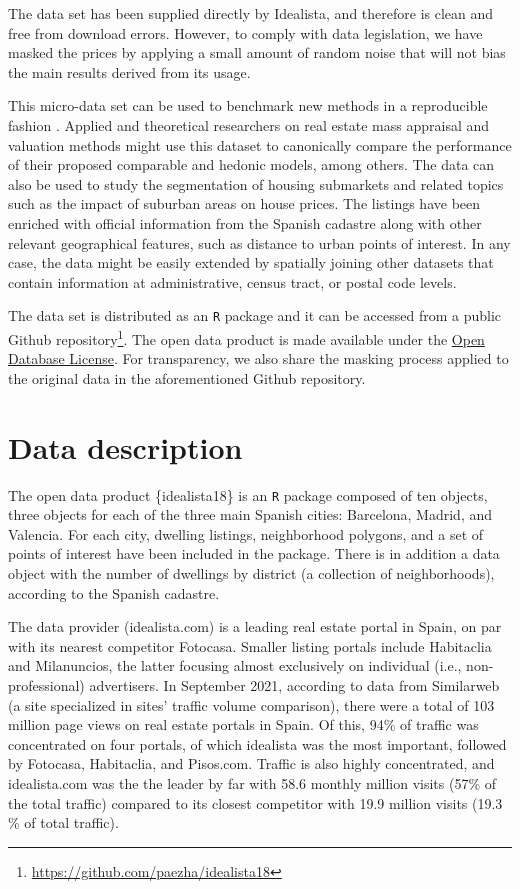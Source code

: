 \documentclass[Royal,times,sageh]{sagej}
\begin{document}
The data set has been supplied directly by Idealista, and therefore is
clean and free from download errors. However, to comply with data
legislation, we have masked the prices by applying a small amount of
random noise that will not bias the main results derived from its usage.

This micro-data set can be used to benchmark new methods in a
reproducible fashion \citep[e.g.,][]{rey2024using}. Applied and
theoretical researchers on real estate mass appraisal and valuation
methods might use this dataset to canonically compare the performance of
their proposed comparable and hedonic models, among others. The data can
also be used to study the segmentation of housing submarkets and related
topics such as the impact of suburban areas on house prices. The
listings have been enriched with official information from the Spanish
cadastre along with other relevant geographical features, such as
distance to urban points of interest. In any case, the data might be
easily extended by spatially joining other datasets that contain
information at administrative, census tract, or postal code levels.

The data set is distributed as an \texttt{R} package and it can be
accessed from a public Github
repository\footnote{\url{https://github.com/paezha/idealista18}}. The
open data product is made available under the
\href{http://opendatacommons.org/licenses/odbl/1.0/}{Open Database License}.
For transparency, we also share the masking process applied to the
original data in the aforementioned Github repository.

\hypertarget{data-description}{%
\section{Data description}\label{data-description}}

The open data product \{idealista18\} is an \texttt{R} package composed
of ten objects, three objects for each of the three main Spanish cities:
Barcelona, Madrid, and Valencia. For each city, dwelling listings,
neighborhood polygons, and a set of points of interest have been
included in the package. There is in addition a data object with the
number of dwellings by district (a collection of neighborhoods),
according to the Spanish cadastre.

The data provider (idealista.com) is a leading real estate portal in
Spain, on par with its nearest competitor Fotocasa. Smaller listing
portals include Habitaclia and Milanuncios, the latter focusing almost
exclusively on individual (i.e., non-professional) advertisers. In
September 2021, according to data from Similarweb (a site specialized in
sites' traffic volume comparison), there were a total of 103 million
page views on real estate portals in Spain. Of this, 94\% of traffic was
concentrated on four portals, of which idealista was the most important,
followed by Fotocasa, Habitaclia, and Pisos.com. Traffic is also highly
concentrated, and idealista.com was the the leader by far with 58.6
monthly million visits (57\% of the total traffic) compared to its
closest competitor with 19.9 million visits (19.3 \% of total traffic).
\end{document}
